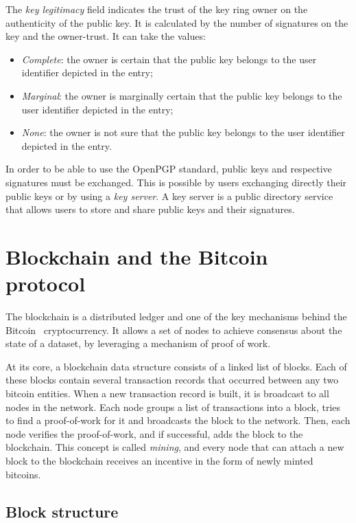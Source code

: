 The \textit{key legitimacy} field indicates the trust of the key ring owner on the authenticity of the public key.
It is calculated by the number of signatures on the key and the owner-trust.
It can take the values:
\begin{itemize}
	\item \textit{Complete}: the owner is certain that the public key belongs to the user identifier depicted in the entry;
	\item \textit{Marginal}: the owner is marginally certain that the public key belongs to the user identifier depicted in the entry;
	\item \textit{None}: the owner is not sure that the public key belongs to the user identifier depicted in the entry.
\end{itemize}

In order to be able to use the OpenPGP standard, public keys and respective signatures must be exchanged.
This is possible by users exchanging directly their public keys or by using a \textit{key server}.
A key server is a public directory service that allows users to store and share public keys and their signatures.

\section{Blockchain and the Bitcoin protocol}
The blockchain is a distributed ledger and one of the key mechanisms behind the
Bitcoin~\cite{Nakamoto2008} cryptocurrency.
It allows a set of nodes to achieve consensus about the state of a dataset, by
leveraging a mechanism of proof of work.

At its core, a blockchain data structure consists of a linked list of blocks.
Each of these blocks contain several transaction records that occurred between any two bitcoin entities.
When a new transaction record is built, it is broadcast to all nodes in the network.
Each node groups a list of transactions into a block, tries to find a
proof-of-work for it and broadcasts the block to the network.
Then, each node verifies the proof-of-work, and if successful, adds the block to the blockchain.
This concept is called \textit{mining}, and every node that can attach a new block to the blockchain receives an incentive in the form of newly minted bitcoins.

\subsection{Block structure}

